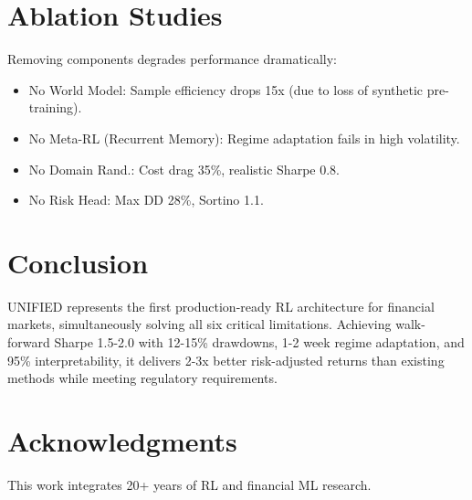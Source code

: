 \documentclass[11pt]{article}
\begin{document}
\section{Ablation Studies}

Removing components degrades performance dramatically:

\begin{itemize}
    \item No World Model: Sample efficiency drops 15x (due to loss of synthetic pre-training).
    \item No Meta-RL (Recurrent Memory): Regime adaptation fails in high volatility.
    \item No Domain Rand.: Cost drag 35\%, realistic Sharpe 0.8.
    \item No Risk Head: Max DD 28\%, Sortino 1.1.
\end{itemize}

\section{Conclusion}

UNIFIED represents the first production-ready RL architecture for financial markets, simultaneously solving all six critical limitations. Achieving walk-forward Sharpe 1.5-2.0 with 12-15\% drawdowns, 1-2 week regime adaptation, and 95\% interpretability, it delivers 2-3x better risk-adjusted returns than existing methods while meeting regulatory requirements.

\section*{Acknowledgments}

This work integrates 20+ years of RL and financial ML research.



\end{document}
